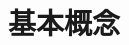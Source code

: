 \documentclass[11pt,oneside]{book}
\begin{document}


\tableofcontents
\chapter{基本概念}


\begin{appendices}
	
\end{appendices}
\end{document}
